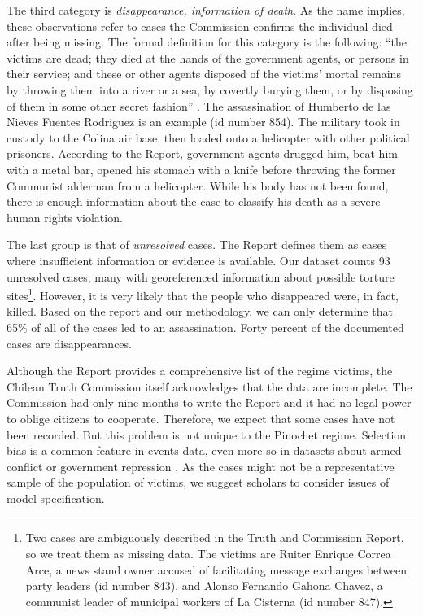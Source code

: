 \documentclass[12pt,a4paper,]{article}
\begin{document}
The third category is \emph{disappearance, information of death}. As the
name implies, these observations refer to cases the Commission confirms
the individual died after being missing. The formal definition for this
category is the following: ``the victims are dead; they died at the
hands of the government agents, or persons in their service; and these
or other agents disposed of the victims' mortal remains by throwing them
into a river or a sea, by covertly burying them, or by disposing of them
in some other secret fashion'' \citep[ 44]{report1991}. The
assassination of Humberto de las Nieves Fuentes Rodriguez is an example
(id number 854). The military took in custody to the Colina air base,
then loaded onto a helicopter with other political prisoners. According
to the Report, government agents drugged him, beat him with a metal bar,
opened his stomach with a knife before throwing the former Communist
alderman from a helicopter. While his body has not been found, there is
enough information about the case to classify his death as a severe
human rights violation.

The last group is that of \emph{unresolved} cases. The Report defines
them as cases where insufficient information or evidence is available.
Our dataset counts 93 unresolved cases, many with georeferenced
information about possible torture sites\footnote{Two cases are
  ambiguously described in the Truth and Commission Report, so we treat
  them as missing data. The victims are Ruiter Enrique Correa Arce, a
  news stand owner accused of facilitating message exchanges between
  party leaders (id number 843), and Alonso Fernando Gahona Chavez, a
  communist leader of municipal workers of La Cisterna (id number 847).}.
However, it is very likely that the people who disappeared were, in
fact, killed. Based on the report and our methodology, we can only
determine that 65\% of all of the cases led to an assassination. Forty
percent of the documented cases are disappearances.

Although the Report provides a comprehensive list of the regime victims,
the Chilean Truth Commission itself acknowledges that the data are
incomplete. The Commission had only nine months to write the Report and
it had no legal power to oblige citizens to cooperate. Therefore, we
expect that some cases have not been recorded. But this problem is not
unique to the Pinochet regime. Selection bias is a common feature in
events data, even more so in datasets about armed conflict or government
repression \citep{ball2019using, chapman2001truth}. As the cases might
not be a representative sample of the population of victims, we suggest
scholars to consider issues of model specification.
\end{document}
